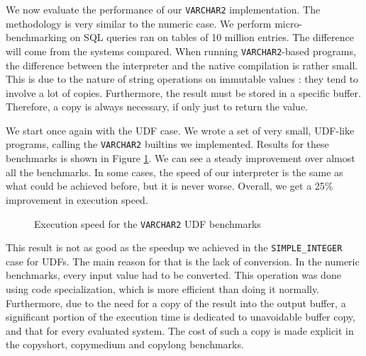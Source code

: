 \documentclass[twoside,11pt,a4paper]{article}
\newcommand{\pls}[1]{\small\texttt{#1}\normalsize}
\newcommand{\plstype}[1]{\pls{#1}}
\newcommand{\varchar}{\plstype{VARCHAR2}}
\newcommand{\simpleint}{\plstype{SIMPLE\_INTEGER}}
\newcommand{\bench}[1]{\textsf{#1}}
\begin{document}
We now evaluate the performance of our \varchar{} implementation. The methodology is very similar to the numeric case. We perform micro-benchmarking on SQL queries ran on tables of 10 million entries. The difference will come from the systems compared. When running \varchar{}-based programs, the difference between the interpreter and the native compilation is rather small. This is due to the nature of string operations on immutable values : they tend to involve a lot of copies. Furthermore, the result must be stored in a specific buffer. Therefore, a copy is always necessary, if only just to return the value.

We start once again with the UDF case. We wrote a set of very small, UDF-like programs, calling the \varchar{} builtins we implemented. Results for these benchmarks is shown in Figure \ref{fig:exp3a}. We can see a steady improvement over almost all the benchmarks. In some cases, the speed of our interpreter is the same as what could be achieved before, but it is never worse. Overall, we get a 25\% improvement in execution speed.

\begin{figure}[tp]
	\centering
	\caption{Execution speed for the \varchar{} UDF benchmarks}
	\label{fig:exp3a}
\end{figure}

This result is not as good as the speedup we achieved in the \simpleint{} case for UDFs. The main reason for that is the lack of conversion. In the numeric benchmarks, every input value had to be converted. This operation was done using code specialization, which is more efficient than doing it normally. Furthermore, due to the need for a copy of the result into the output buffer, a significant portion of the execution time is dedicated to unavoidable buffer copy, and that for every evaluated system. The cost of such a copy is made explicit in the \bench{copyshort}, \bench{copymedium} and \bench{copylong} benchmarks.
\end{document}
